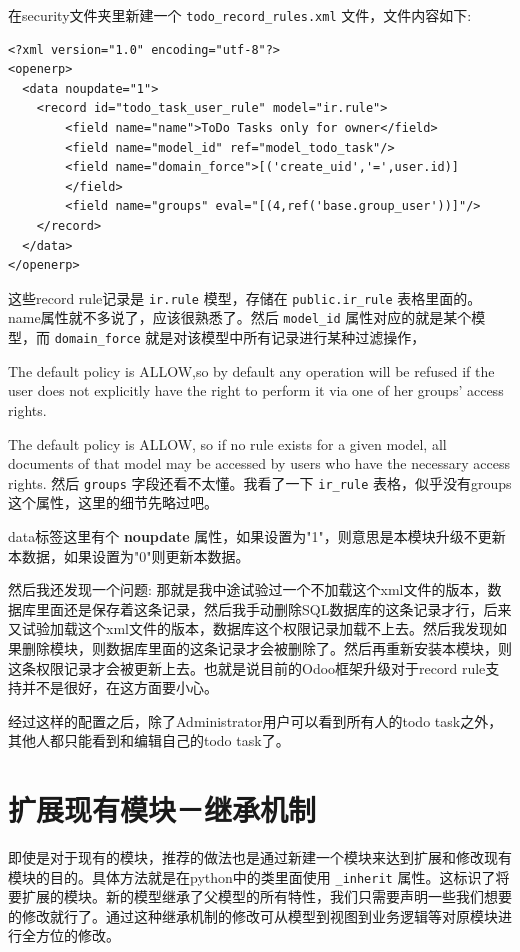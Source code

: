 \documentclass[11pt,a4paper]{sphinxmanual}
\begin{document}
在security文件夹里新建一个 \verb~todo_record_rules.xml~ 文件，文件内容如下:

\begin{verbatim}
<?xml version="1.0" encoding="utf-8"?>
<openerp>
  <data noupdate="1">
    <record id="todo_task_user_rule" model="ir.rule">
        <field name="name">ToDo Tasks only for owner</field>
        <field name="model_id" ref="model_todo_task"/>
        <field name="domain_force">[('create_uid','=',user.id)]
        </field>
        <field name="groups" eval="[(4,ref('base.group_user'))]"/>
    </record>
  </data>
</openerp>
\end{verbatim}

这些record rule记录是 \verb~ir.rule~ 模型，存储在 \verb~public.ir_rule~ 表格里面的。name属性就不多说了，应该很熟悉了。然后 \verb~model_id~ 属性对应的就是某个模型，而 \verb~domain_force~ 就是对该模型中所有记录进行某种过滤操作，

The default policy is ALLOW,so by default any operation will be refused if the user does not explicitly have the right to perform it via one of her groups' access rights.

 The default policy is ALLOW, so if no rule exists for a given model, all documents of that model may be accessed by users who have the necessary access rights.
然后 \verb~groups~ 字段还看不太懂。我看了一下 \verb~ir_rule~ 表格，似乎没有groups这个属性，这里的细节先略过吧。


data标签这里有个 \textbf{noupdate} 属性，如果设置为"1"，则意思是本模块升级不更新本数据，如果设置为"0"则更新本数据。

然后我还发现一个问题: 那就是我中途试验过一个不加载这个xml文件的版本，数据库里面还是保存着这条记录，然后我手动删除SQL数据库的这条记录才行，后来又试验加载这个xml文件的版本，数据库这个权限记录加载不上去。然后我发现如果删除模块，则数据库里面的这条记录才会被删除了。然后再重新安装本模块，则这条权限记录才会被更新上去。也就是说目前的Odoo框架升级对于record rule支持并不是很好，在这方面要小心。

经过这样的配置之后，除了Administrator用户可以看到所有人的todo task之外，其他人都只能看到和编辑自己的todo task了。




\chapter{扩展现有模块－继承机制}
\label{sec-8}
即使是对于现有的模块，推荐的做法也是通过新建一个模块来达到扩展和修改现有模块的目的。具体方法就是在python中的类里面使用 \verb~_inherit~ 属性。这标识了将要扩展的模块。新的模型继承了父模型的所有特性，我们只需要声明一些我们想要的修改就行了。通过这种继承机制的修改可从模型到视图到业务逻辑等对原模块进行全方位的修改。
\end{document}
